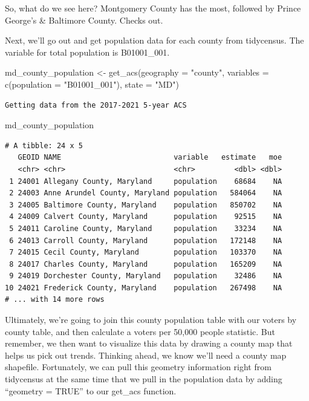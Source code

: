 \documentclass[
  letterpaper,
  DIV=11,
  numbers=noendperiod]{scrreprt}
\newenvironment{Shaded}{\begin{snugshade}}{\end{snugshade}}
\newcommand{\AttributeTok}[1]{\textcolor[rgb]{0.40,0.45,0.13}{#1}}
\newcommand{\FunctionTok}[1]{\textcolor[rgb]{0.28,0.35,0.67}{#1}}
\newcommand{\NormalTok}[1]{\textcolor[rgb]{0.00,0.23,0.31}{#1}}
\newcommand{\OtherTok}[1]{\textcolor[rgb]{0.00,0.23,0.31}{#1}}
\newcommand{\StringTok}[1]{\textcolor[rgb]{0.13,0.47,0.30}{#1}}
\begin{document}
So, what do we see here? Montgomery County has the most, followed by
Prince George's \& Baltimore County. Checks out.

Next, we'll go out and get population data for each county from
tidycensus. The variable for total population is B01001\_001.

\begin{Shaded}
\begin{Highlighting}[]
\NormalTok{md\_county\_population }\OtherTok{\textless{}{-}} \FunctionTok{get\_acs}\NormalTok{(}\AttributeTok{geography =} \StringTok{"county"}\NormalTok{,}
              \AttributeTok{variables =} \FunctionTok{c}\NormalTok{(}\AttributeTok{population =} \StringTok{"B01001\_001"}\NormalTok{),}
              \AttributeTok{state =} \StringTok{"MD"}\NormalTok{)}
\end{Highlighting}
\end{Shaded}

\begin{verbatim}
Getting data from the 2017-2021 5-year ACS
\end{verbatim}

\begin{Shaded}
\begin{Highlighting}[]
\NormalTok{md\_county\_population}
\end{Highlighting}
\end{Shaded}

\begin{verbatim}
# A tibble: 24 x 5
   GEOID NAME                          variable   estimate   moe
   <chr> <chr>                         <chr>         <dbl> <dbl>
 1 24001 Allegany County, Maryland     population    68684    NA
 2 24003 Anne Arundel County, Maryland population   584064    NA
 3 24005 Baltimore County, Maryland    population   850702    NA
 4 24009 Calvert County, Maryland      population    92515    NA
 5 24011 Caroline County, Maryland     population    33234    NA
 6 24013 Carroll County, Maryland      population   172148    NA
 7 24015 Cecil County, Maryland        population   103370    NA
 8 24017 Charles County, Maryland      population   165209    NA
 9 24019 Dorchester County, Maryland   population    32486    NA
10 24021 Frederick County, Maryland    population   267498    NA
# ... with 14 more rows
\end{verbatim}

Ultimately, we're going to join this county population table with our
voters by county table, and then calculate a voters per 50,000 people
statistic. But remember, we then want to visualize this data by drawing
a county map that helps us pick out trends. Thinking ahead, we know
we'll need a county map shapefile. Fortunately, we can pull this
geometry information right from tidycensus at the same time that we pull
in the population data by adding ``geometry = TRUE'' to our get\_acs
function.
\end{document}
